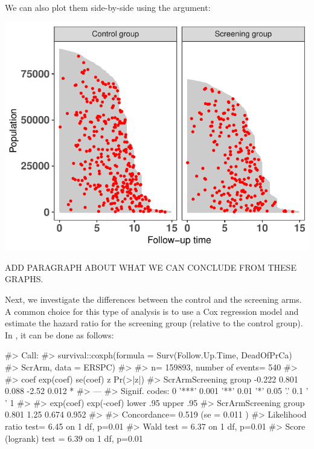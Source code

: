 \documentclass[
]{jss}
\begin{document}
We can also plot them side-by-side using the  argument:

\begin{CodeChunk}


\begin{center}\includegraphics{../figures/plot-stratified-erspc-data-side-1} \end{center}

\end{CodeChunk}

ADD PARAGRAPH ABOUT WHAT WE CAN CONCLUDE FROM THESE GRAPHS.

Next, we investigate the differences between the control and the
screening arms. A common choice for this type of analysis is to use a
Cox regression model and estimate the hazard ratio for the screening
group (relative to the control group). In , it can be done
as follows:

\begin{CodeChunk}

\begin{CodeOutput}
#> Call:
#> survival::coxph(formula = Surv(Follow.Up.Time, DeadOfPrCa) ~ 
#>     ScrArm, data = ERSPC)
#> 
#>   n= 159893, number of events= 540 
#> 
#>                         coef exp(coef) se(coef)     z Pr(>|z|)  
#> ScrArmScreening group -0.222     0.801    0.088 -2.52    0.012 *
#> ---
#> Signif. codes:  0 '***' 0.001 '**' 0.01 '*' 0.05 '.' 0.1 ' ' 1
#> 
#>                       exp(coef) exp(-coef) lower .95 upper .95
#> ScrArmScreening group     0.801       1.25     0.674     0.952
#> 
#> Concordance= 0.519  (se = 0.011 )
#> Likelihood ratio test= 6.45  on 1 df,   p=0.01
#> Wald test            = 6.37  on 1 df,   p=0.01
#> Score (logrank) test = 6.39  on 1 df,   p=0.01
\end{CodeOutput}
\end{CodeChunk}
\end{document}
